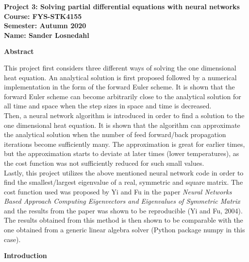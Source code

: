 \documentclass[12pt,a4paper]{article}
\begin{document}
\begin{center}
\LARGE{\textbf{Project 3: Solving partial differential equations with neural networks}}
\\
\large{\textbf{Course: FYS-STK4155}}
\\
\large{\textbf{Semester: Autumn 2020}}
\\
\large{\textbf{Name: Sander Losnedahl}}
\end{center}

\begin{center}
\Large{\textbf{Abstract}}
\end{center}

\noindent This project first considers three different ways of solving the one dimensional heat equation. An analytical solution is first proposed followed by a numerical implementation in the form of the forward Euler scheme. It is shown that the forward Euler scheme can become arbitrarily close to the analytical solution for all time and space when the step sizes in space and time is decreased. 
\\
Then, a neural network algorithm is introduced in order to find a solution to the one dimensional heat equation. It is shown that the algorithm can approximate the analytical solution when the number of feed forward/back propagation iterations become sufficiently many. The approximation is great for earlier times, but the approximation starts to deviate at later times (lower temperatures), as the cost function was not sufficiently reduced for such small values.
\\
Lastly, this project utilizes the above mentioned neural network code in order to find the smallest/largest eigenvalue of a real, symmetric and square matrix. The cost function used was proposed by Yi and Fu in the paper \emph{Neural Networks Based Approach Computing Eigenvectors and Eigenvalues of Symmetric Matrix} and the results from the paper was shown to be reproducible (Yi and Fu, 2004). The results obtained from this method is then shown to be comparable with the one obtained from a generic linear algebra solver (Python package numpy in this case).

\newpage

\begin{center}
\Large{\textbf{Introduction}}
\end{center}
\end{document}
